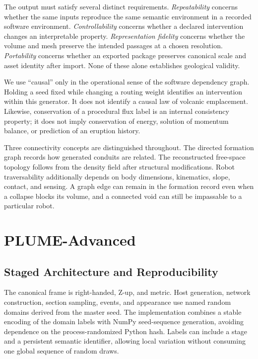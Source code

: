 \documentclass[conference]{IEEEtran}
\begin{document}
The output must satisfy several distinct requirements. \emph{Repeatability} concerns whether the same inputs reproduce the same semantic environment in a recorded software environment. \emph{Controllability} concerns whether a declared intervention changes an interpretable property. \emph{Representation fidelity} concerns whether the volume and mesh preserve the intended passages at a chosen resolution. \emph{Portability} concerns whether an exported package preserves canonical scale and asset identity after import. None of these alone establishes geological validity.

We use ``causal'' only in the operational sense of the software dependency graph. Holding a seed fixed while changing a routing weight identifies an intervention within this generator. It does not identify a causal law of volcanic emplacement. Likewise, conservation of a procedural flux label is an internal consistency property; it does not imply conservation of energy, solution of momentum balance, or prediction of an eruption history.

Three connectivity concepts are distinguished throughout. The directed formation graph records how generated conduits are related. The reconstructed free-space topology follows from the density field after structural modifications. Robot traversability additionally depends on body dimensions, kinematics, slope, contact, and sensing. A graph edge can remain in the formation record even when a collapse blocks its volume, and a connected void can still be impassable to a particular robot.

\section{PLUME-Advanced}
\label{sec:method}
\subsection{Staged Architecture and Reproducibility}
The canonical frame is right-handed, Z-up, and metric. Host generation, network construction, section sampling, events, and appearance use named random domains derived from the master seed. The implementation combines a stable encoding of the domain labels with NumPy seed-sequence generation, avoiding dependence on the process-randomized Python hash. Labels can include a stage and a persistent semantic identifier, allowing local variation without consuming one global sequence of random draws.
\end{document}
